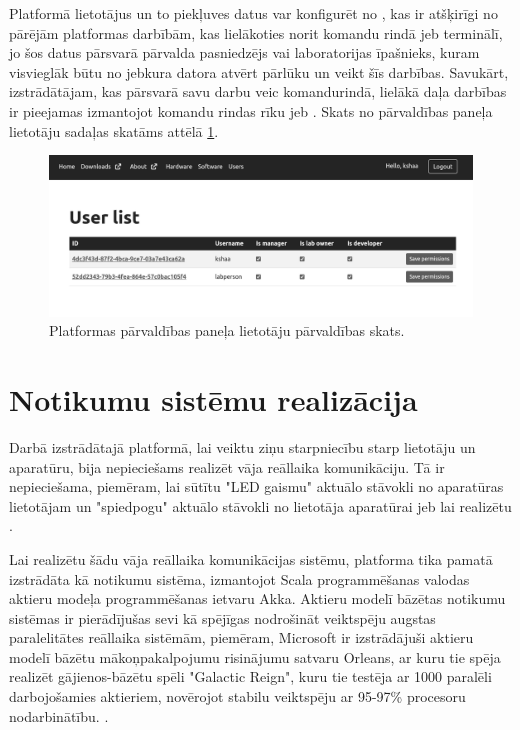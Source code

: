 Platformā lietotājus un to piekļuves datus var konfigurēt no
, kas ir atšķirīgi no pārējām platformas
darbībām, kas lielākoties norit komandu rindā jeb terminālī, jo šos datus
pārsvarā pārvalda pasniedzējs vai laboratorijas īpašnieks, kuram visvieglāk būtu
no jebkura datora atvērt pārlūku un veikt šīs darbības. Savukārt, izstrādātājam,
kas pārsvarā savu darbu veic komandurindā, lielākā daļa darbības ir pieejamas
izmantojot komandu rindas rīku jeb . Skats no
pārvaldības paneļa lietotāju sadaļas skatāms attēlā \ref{fig:mgmtpanelusr}.

\begin{figure}[H]
    \includegraphics[width=0.9\linewidth]{assets/mgmt-panel-usr-gray.png}
    \centering
    \caption{Platformas pārvaldības paneļa lietotāju pārvaldības skats.}
    \label{fig:mgmtpanelusr}
\end{figure}

\section{Notikumu sistēmu realizācija}
\label{sec:dipactorsystem}

Darbā izstrādātajā platformā, lai veiktu ziņu starpniecību starp lietotāju un
aparatūru, bija nepieciešams realizēt vāja reāllaika komunikāciju. Tā ir
nepieciešama, piemēram, lai sūtītu "LED gaismu" aktuālo stāvokli no aparatūras
lietotājam un "spiedpogu" aktuālo stāvokli no lietotāja aparatūrai jeb lai
realizētu .

Lai realizētu šādu vāja reāllaika komunikācijas sistēmu, platforma tika pamatā
izstrādāta kā notikumu sistēma, izmantojot Scala programmēšanas valodas aktieru
modeļa programmēšanas ietvaru Akka. Aktieru modelī bāzētas notikumu sistēmas ir
pierādījušas sevi kā spējīgas nodrošināt veiktspēju augstas paralelitātes
reāllaika sistēmām, piemēram, Microsoft ir izstrādājuši aktieru modelī bāzētu
mākoņpakalpojumu risinājumu satvaru Orleans, ar kuru tie spēja realizēt
gājienos-bāzētu spēli "Galactic Reign", kuru tie testēja ar 1000 paralēli
darbojošamies aktieriem, novērojot stabilu veiktspēju ar 95-97\% procesoru
nodarbinātību. \cite[para. 5.1, 5.2]{Bernstein2014}.

